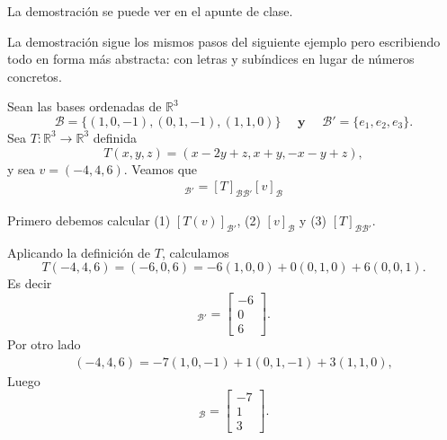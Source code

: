 \documentclass[handout]{beamer} %
\newcommand{\R}{\mathbb R}
\newcommand{\cB}{\mathcal{B}}
\begin{document}
    \begin{frame}
    La demostración se puede ver en el apunte de clase.
    \pause
    \
    
    La demostración sigue los mismos pasos del siguiente ejemplo pero escribiendo todo en forma más abstracta: con letras y subíndices en lugar de números concretos.
    \end{frame}
    
    
    
    \begin{frame}
        \begin{ejemplo}
            Sean las bases ordenadas de $\R^3$
            $$\cB = \{(1,0,-1),(0,1,-1),(1,1,0)\}\quad \textbf{ y } \quad\cB' = \{e_1,e_2,e_3\}.$$ 
            Sea $T: \R^3 \to \R^3$ definida
            $$
            T(x,y,z) = (x-2y+z, x+y, -x-y+z),
            $$ 
            y sea $v=(-4,4,6)$. Veamos  que 
        \begin{align*}
            [T(v)]_{\cB'}=[T]_{\cB\cB'}[v]_{\cB}
            \end{align*}
        \end{ejemplo}\pause
        \begin{solucion}\pause
            Primero debemos calcular (1) $[T(v)]_{\cB'}$,\; (2) $[v]_{\cB}$\; y \;(3) $[T]_{\cB\cB'}$.
        \end{solucion}	
    \end{frame}
    
    
    \begin{frame}
        Aplicando la definición de $T$, calculamos
        $$
        T(-4,4,6) = (-6,0,6) = -6(1,0,0) +0(0,1,0) + 6(0,0,1).
        $$
        Es decir 
        \begin{equation*}
            [T(v)]_{\cB'} = \begin{bmatrix}
                -6 \\0\\6
            \end{bmatrix}.\tag{1}
        \end{equation*}
        \pause
        Por otro  lado
        \begin{align*}
            (-4,4,6) = -7(1,0,-1) +1(0,1,-1)+3(1,1,0),
        \end{align*}
        Luego
        \begin{equation*}
            [v]_{\cB} = \begin{bmatrix}
                -7 \\1\\3
            \end{bmatrix}.\tag{2}
        \end{equation*}
    \end{frame}
    
\end{document}
